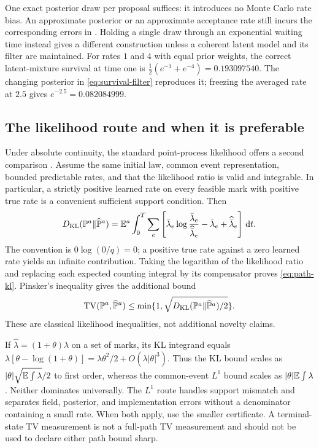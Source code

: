 One exact posterior draw per proposal suffices: it introduces no Monte Carlo rate bias. An approximate posterior or an approximate acceptance rate still incurs the corresponding errors in . Holding a single draw through an exponential waiting time instead gives a different construction unless a coherent latent model and its filter are maintained. For rates $1$ and $4$ with equal prior weights, the correct latent-mixture survival at time one is
$\tfrac12(e^{-1}+e^{-4})=0.193097540$.
The changing posterior in \eqref{eq:survival-filter} reproduces it; freezing the averaged rate at $2.5$ gives $e^{-2.5}=0.082084999$.

\subsection{The likelihood route and when it is preferable}\label{sec:kl}
Under absolute continuity, the standard point-process likelihood offers a second comparison \citep{bremaud1981}. Assume the same initial law, common event representation, bounded predictable rates, and that the likelihood ratio is valid and integrable. In particular, a strictly positive learned rate on every feasible mark with positive true rate is a convenient sufficient support condition. Then
\begin{equation}\label{eq:path-kl}
 D_{\rm KL}(\mathbb P^a\|\widehat{\mathbb P}^a)
 =\mathbb E^a\int_0^T\sum_e\left[
 \bar\lambda_e\log\frac{\bar\lambda_e}{\widehat{\bar\lambda}_e}
 -\bar\lambda_e+\widehat{\bar\lambda}_e\right]\,\mathrm d t.
\end{equation}
The convention is $0\log(0/q)=0$; a positive true rate against a zero learned rate yields an infinite contribution. Taking the logarithm of the likelihood ratio and replacing each expected counting integral by its compensator proves \eqref{eq:path-kl}. Pinsker's inequality gives the additional bound
\begin{equation}\label{eq:pinsker}
 \operatorname{TV}(\mathbb P^a,\widehat{\mathbb P}^a)
 \le\min\{1,\sqrt{D_{\rm KL}(\mathbb P^a\|\widehat{\mathbb P}^a)/2}\}.
\end{equation}
These are classical likelihood inequalities, not additional novelty claims.

If $\widehat\lambda=(1+\theta)\lambda$ on a set of marks, its KL integrand equals
$\lambda[\theta-\log(1+\theta)]
=\lambda\theta^2/2+O(\lambda|\theta|^3)$.
Thus the KL bound scales as $|\theta|\sqrt{\mathbb E\int\lambda}/2$ to first order, whereas the common-event $L^1$ bound scales as $|\theta|\mathbb E\int\lambda$. Neither dominates universally. The $L^1$ route handles support mismatch and separates field, posterior, and implementation errors without a denominator containing a small rate. When both apply, use the smaller certificate. A terminal-state TV measurement is not a full-path TV measurement and should not be used to declare either path bound sharp.

